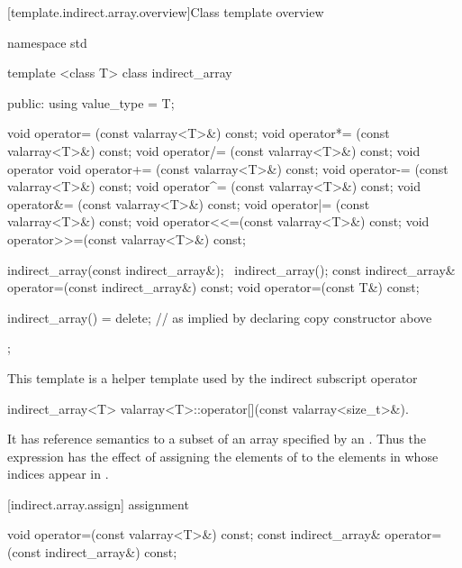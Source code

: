 [template.indirect.array.overview]{Class template  overview}

%
\begin{codeblock}
namespace std {
  template <class T> class indirect_array {
  public:
    using value_type = T;

    void operator=  (const valarray<T>&) const;
    void operator*= (const valarray<T>&) const;
    void operator/= (const valarray<T>&) const;
    void operator%
    void operator+= (const valarray<T>&) const;
    void operator-= (const valarray<T>&) const;
    void operator^= (const valarray<T>&) const;
    void operator&= (const valarray<T>&) const;
    void operator|= (const valarray<T>&) const;
    void operator<<=(const valarray<T>&) const;
    void operator>>=(const valarray<T>&) const;

    indirect_array(const indirect_array&);
   ~indirect_array();
    const indirect_array& operator=(const indirect_array&) const;
    void operator=(const T&) const;

    indirect_array() = delete;        // as implied by declaring copy constructor above
  };
}
\end{codeblock}

\pnum
This template is a helper template used by the indirect subscript operator

%
\begin{itemdecl}
indirect_array<T> valarray<T>::operator[](const valarray<size_t>&).
\end{itemdecl}

\begin{itemdescr}
\pnum
It has reference semantics to a subset of an array specified by an
.
Thus the expression
has the effect of assigning the elements of
to the elements in
whose indices appear in
.
\end{itemdescr}

[indirect.array.assign]{ assignment}

%
\begin{itemdecl}
void operator=(const valarray<T>&) const;
const indirect_array& operator=(const indirect_array&) const;
\end{itemdecl}

